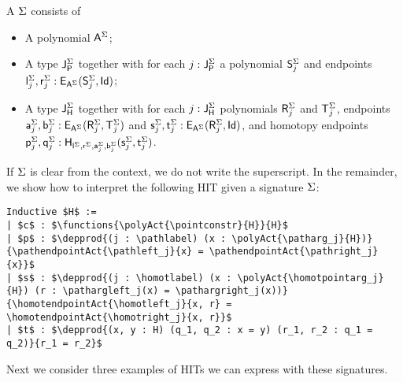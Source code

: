 \begin{definition}
\label{def:signature}
A  $\sign$ consists of
\begin{itemize}
	\item A polynomial $\pointconstr[\sign]$;
	\item A type $\pathlabel[\sign]$ together with for each $j : \pathlabel[\sign]$ a polynomial $\patharg[\sign]_j$ and endpoints $\pathleft[\sign]_j, \pathright[\sign]_j : \pathendpoint{\pointconstr[\sign]}{\patharg[\sign]_j}{\idP}$;
	\item A type $\homotlabel[\sign]$ together with for each $j : \homotlabel[\sign]$ polynomials $\homotpointarg[\sign]_j$ and $\homotpathtarg[\sign]_j$,
	endpoints $\pathargleft[\sign]_j, \pathargright[\sign]_j : \pathendpoint{\pointconstr[\sign]}{\homotpointarg[\sign]_j}{\homotpathtarg[\sign]_j}$
	and $\homotpathleft[\sign]_j, \homotpathright[\sign]_j : \pathendpoint{\pointconstr[\sign]}{\homotpointarg[\sign]_j}{\idP}$,
	and homotopy endpoints $\homotleft[\sign]_j, \homotright[\sign]_j : \homotendpoint{\pathleft[\sign]}{\pathright[\sign]}{\pathargleft[\sign]_j}{\pathargright[\sign]_j}{\homotpathleft[\sign]_j}{\homotpathright[\sign]_j}$.
\end{itemize}
\end{definition}

If $\sign$ is clear from the context, we do not write the superscript.
In the remainder, we show how to interpret the following HIT given a signature $\sign$:

\begin{lstlisting}[mathescape=true]
Inductive $H$ :=
| $c$ : $\functions{\polyAct{\pointconstr}{H}}{H}$
| $p$ : $\depprod{(j : \pathlabel) (x : \polyAct{\patharg_j}{H})}{\pathendpointAct{\pathleft_j}{x} = \pathendpointAct{\pathright_j}{x}}$
| $s$ : $\depprod{(j : \homotlabel) (x : \polyAct{\homotpointarg_j}{H}) (r : \pathargleft_j(x) = \pathargright_j(x))}{\homotendpointAct{\homotleft_j}{x, r} = \homotendpointAct{\homotright_j}{x, r}}$
| $t$ : $\depprod{(x, y : H) (q_1, q_2 : x = y) (r_1, r_2 : q_1 = q_2)}{r_1 = r_2}$
\end{lstlisting}

Next we consider three examples of HITs we can express with these signatures.

